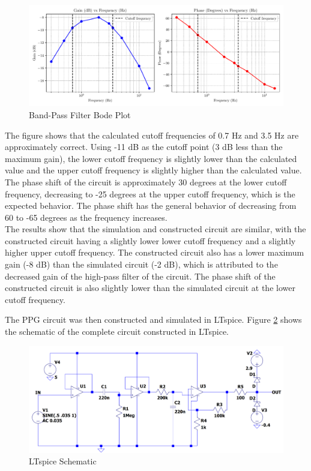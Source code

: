 \documentclass[CMPE]{KGCOEReport}
\begin{document}
\begin{figure}[H]
    \centering
    \includegraphics[width=1\textwidth]{band_pass_plot.pdf}
    \caption{Band-Pass Filter Bode Plot}
    \label{fig:bandPassBode}
\end{figure}

The figure shows that the calculated cutoff frequencies of 0.7 Hz and 3.5 Hz are approximately correct. Using -11 dB as the cutoff point (3 dB less than the maximum gain), the lower cutoff frequency is slightly lower than the calculated value and the upper cutoff frequency is slightly higher than the calculated value. The phase shift of the circuit is approximately 30 degrees at the lower cutoff frequency, decreasing to -25 degrees at the upper cutoff frequency, which is the expected behavior. The phase shift has the general behavior of decreasing from 60 to -65 degrees as the frequency increases.\\

The results show that the simulation and constructed circuit are similar, with the constructed circuit having a slightly lower lower cutoff frequency and a slightly higher upper cutoff frequency. The constructed circuit also has a lower maximum gain (-8 dB) than the simulated circuit (-2 dB), which is attributed to the decreased gain of the high-pass filter of the circuit. The phase shift of the constructed circuit is also slightly lower than the simulated circuit at the lower cutoff frequency.

\bigskip

The PPG circuit was then constructed and simulated in LTspice. Figure \ref{fig:ltspiceSchematic} shows the schematic of the complete circuit constructed in LTspice.

\begin{figure}[H]
    \centering
    \includegraphics[width=1\textwidth]{LTspiceSchematic.png}
    \caption{LTspice Schematic}
    \label{fig:ltspiceSchematic}
\end{figure}
\end{document}
